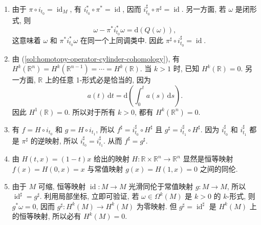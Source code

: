 \begin{description}[font=\normalfont,leftmargin=2em,labelwidth=1.5em]
\begin{enumerate}[label=(\alph*),ref=\alph*,leftmargin=*]
从而,
\begin{align*}
  \mathrm{d}(Q(\omega))+Q(\mathrm{d}\omega)
  &=\mathrm{d}t\wedge\sum_I a_I(t,x)\,\mathrm{d}x^I
    +\sum_J(b(t,x)-b(t_0,x))\,\mathrm{d}x^J\\
  &=\omega-\pi^*i_{t_0}^*\omega.
\end{align*}
\item\label{sol:homotopy-operator-cylinder-cohomology} 由于 $\pi\circ i_{t_0}=\operatorname{id}_M$, 有 $i_{t_0}^*\circ\pi^*=\operatorname{id}$, 因而 $i_{t_0}^\sharp\circ\pi^\sharp=\operatorname{id}$. 另一方面, 若 $\omega$ 是闭形式, 则
\[
  \omega-\pi^*i_{t_0}^*\omega=\mathrm{d}(Q(\omega)),
\]
这意味着 $\omega$ 和 $\pi^*i_{t_0}^*\omega$ 在同一个上同调类中. 因此 $\pi^\sharp\circ i_{t_0}^\sharp=\operatorname{id}$.
\item 由 (\ref{sol:homotopy-operator-cylinder-cohomology}), 有 $H^k(\mathbb{R}^n)=H^k(\mathbb{R}^{n-1})=\cdots=H^k(\mathbb{R})$. 当 $k>1$ 时, 已知 $H^k(\mathbb{R})=0$. 另一方面, $\mathbb{R}$ 上的任意 1-形式必是恰当的, 因为
\[
  a(t)\,\mathrm{d}t=\mathrm{d}\left(\int_0^t a(s)\,\mathrm{d}s\right).
\]
因此 $H^1(\mathbb{R})=0$. 所以对于所有 $k>0$, 都有 $H^k(\mathbb{R}^n)=0$.
\item 有 $f=H\circ i_{t_0}$ 和 $g=H\circ i_{t_1}$, 所以 $f^\sharp=i_{t_0}^\sharp\circ H^\sharp$ 且 $g^\sharp=i_{t_1}^\sharp\circ H^\sharp$. 因为 $i_{t_0}^\sharp$ 和 $i_{t_1}^\sharp$ 都是 $\pi^\sharp$ 的逆映射, 所以 $i_{t_0}^\sharp=i_{t_1}^\sharp$. 从而 $f^\sharp=g^\sharp$.
\item 由 $H(t,x)=(1-t)x$ 给出的映射 $H:\mathbb{R}\times\mathbb{R}^n\to\mathbb{R}^n$ 显然是恒等映射 $f(x)=H(0,x)=x$ 与常值映射 $g(x)=H(1,x)=0$ 之间的同伦.
\item 由于 $M$ 可缩, 恒等映射 $\operatorname{id}:M\to M$ 光滑同伦于常值映射 $g:M\to M$, 所以 $\operatorname{id}^\sharp=g^\sharp$. 利用局部坐标, 立即可验证, 若 $\omega\in\Omega^k(M)$ 是 $k>0$ 的 $k$-形式, 则 $g^*\omega=0$, 因而 $g^\sharp:H^k(M)\to H^k(M)$ 为零映射. 但 $g^\sharp=\operatorname{id}^\sharp$ 是 $H^k(M)$ 上的恒等映射, 所以必有 $H^k(M)=0$.
\end{enumerate}


\end{description}
